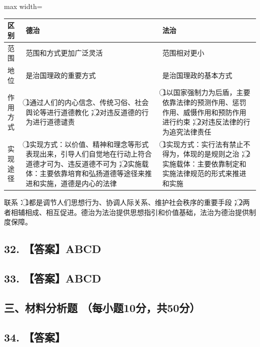 \documentclass[UTF8,11pt]{ctexart}
\begin{document}
\begin{center}\begin{adjustbox}{max width=\linewidth}\begin{tabular}{|>{\raggedright\arraybackslash}p{\dimexpr(\linewidth-6\tabcolsep-4\arrayrulewidth)/3\relax}|>{\raggedright\arraybackslash}p{\dimexpr(\linewidth-6\tabcolsep-4\arrayrulewidth)/3\relax}|>{\raggedright\arraybackslash}p{\dimexpr(\linewidth-6\tabcolsep-4\arrayrulewidth)/3\relax}|}\hline
区别 & 德治 & 法治\\\hline
范围 & 范围和方式更加广泛灵活 & 范围相对更小\\\hline
地位 & 是治国理政的重要方式 & 是治国理政的基本方式\\\hline
作用方式 & \textcircled{1}通过人们的内心信念、传统习俗、社会舆论等进行道德教化；\textcircled{2}对违反道德的行为进行道德谴责 & \textcircled{1}以国家强制力为后盾，主要依靠法律的预测作用、惩罚作用、威慑作用和预防作用进行约束；\textcircled{2}对违反法律的行为追究法律责任\\\hline
实现途径 & \textcircled{1}实现方式：以价值、精神和理念等形式表现出来，引导人们自觉地在行动上符合道德才可为、违反道德不可为；\textcircled{2}实施载体：主要依靠培育和弘扬道德等途径来推进和实施，道德是内心的法律 & \textcircled{1}实现方式：实行法有禁止不得为，体现的是规则之治；\textcircled{2}实施载体：主要依靠制定和实施法律规范的形式来推进和实施\\\hline\end{tabular}\end{adjustbox}\end{center}

联系：\textcircled{1}都是调节人们思想行为、协调人际关系、维护社会秩序的重要手段；\textcircled{2}两者相辅相成、相互促进。德治为法治提供思想指引和价值基础，法治为德治提供制度保障。


\subsection*{32. 【答案】ABCD}

\subsection*{33. 【答案】ABCD}

\subsection*{三、材料分析题 （每小题10分，共50分）}

\subsection*{34. 【答案】}
\end{document}
